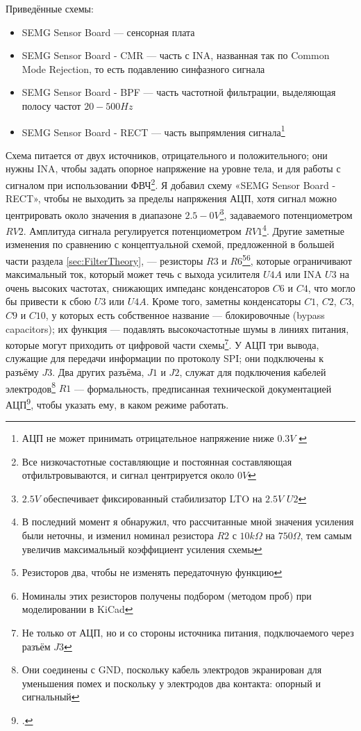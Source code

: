 \documentclass[a4paper, 10pt, final]{article} %
\newcommand{\parenciteit}[2]{\textit{\parencite[#1]{#2}}} %
\begin{document}
    \noindent Приведённые схемы:
    \begin{itemize}
        \item SEMG Sensor Board --- сенсорная плата
        \item SEMG Sensor Board - CMR --- часть с INA, названная так по Common Mode Rejection, то есть подавлению синфазного сигнала
        \item SEMG Sensor Board - BPF --- часть частотной фильтрации, выделяющая полосу частот $20-500Hz$
        \item SEMG Sensor Board - RECT --- часть выпрямления сигнала\footnote{АЦП не может принимать отрицательное напряжение ниже $0.3V$ \parenciteit{p8}{TLV2541:Datasheet}}
    \end{itemize}
    Схема питается от двух источников, отрицательного и положительного; они нужны INA, чтобы задать опорное напряжение на уровне тела, и для работы с сигналом при использовании ФВЧ\footnote{Все низкочастотные составляющие и постоянная составляющая отфильтровываются, и сигнал центрируется около $0V$}.
    Я добавил схему «SEMG Sensor Board - RECT», чтобы не выходить за пределы напряжения АЦП, хотя сигнал можно центрировать около значения в диапазоне $2.5-0V$\footnote{$2.5V$ обеспечивает фиксированный стабилизатор LTO на $2.5V$ $U2$}, задаваемого потенциометром $RV2$.
    Амплитуда сигнала регулируется потенциометром $RV1$\footnote{В последний момент я обнаружил, что рассчитанные мной значения усиления были неточны, и изменил номинал резистора $R2$ с $10k\Omega$ на $750\Omega$, тем самым увеличив максимальный коэффициент усиления схемы}.
    Другие заметные изменения по сравнению с концептуальной схемой, предложенной в большей части раздела \ref{sec:FilterTheory}, --- резисторы $R3$ и $R6$\footnote{Резисторов два, чтобы не изменять передаточную функцию}\:\footnote{Номиналы этих резисторов получены подбором (методом проб) при моделировании в KiCad}, которые ограничивают максимальный ток, который может течь с выхода усилителя $U4A$ или INA $U3$ на очень высоких частотах, снижающих импеданс конденсаторов $C6$ и $C4$, что могло бы привести к сбою $U3$ или $U4A$.
    Кроме того, заметны конденсаторы $C1$, $C2$, $C3$, $C9$ и $C10$, у которых есть собственное название --- блокировочные (bypass capacitors); их функция --- подавлять высокочастотные шумы в линиях питания, которые могут приходить от цифровой части схемы\footnote{Не только от АЦП, но и со стороны источника питания, подключаемого через разъём $J3$}.
    У АЦП три вывода, служащие для передачи информации по протоколу SPI; они подключены к разъёму $J3$.
    Два других разъёма, $J1$ и $J2$, служат для подключения кабелей электродов\footnote{Они соединены с GND, поскольку кабель электродов экранирован для уменьшения помех и поскольку у электродов два контакта: опорный и сигнальный}
    $R1$ --- формальность, предписанная технической документацией АЦП\footcite[p5,p21]{TLV2541:Datasheet}, чтобы указать ему, в каком режиме работать.
\end{document}
